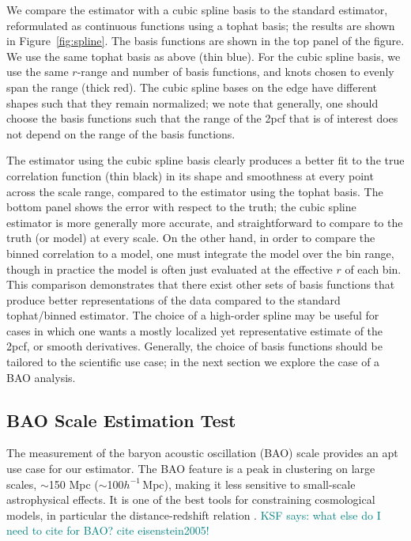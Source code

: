 \documentclass[modern]{aastex62}
\newcommand{\cf}{2pcf\xspace} %
\newcommand{\hmpc}{$h^{-1}\,$Mpc}
\newcommand{\KSF}[1]{\textcolor{teal}{KSF says: #1}}
\begin{document}
We compare the estimator with a cubic spline basis to the standard estimator, reformulated as continuous functions using a tophat basis; the results are shown in Figure~\ref{fig:spline}.
The basis functions are shown in the top panel of the figure.
We use the same tophat basis as above (thin blue).
For the cubic spline basis, we use the same $r$-range and number of basis functions, and knots chosen to evenly span the range (thick red). 
The cubic spline bases on the edge have different shapes such that they remain normalized; we note that generally, one should choose the basis functions such that the range of the \cf that is of interest does not depend on the range of the basis functions.

The estimator using the cubic spline basis clearly produces a better fit to the true correlation function (thin black) in its shape and smoothness at every point across the scale range, compared to the estimator using the tophat basis.
The bottom panel shows the error with respect to the truth; the cubic spline estimator is more generally more accurate, and straightforward to compare to the truth (or model) at every scale.
On the other hand, in order to compare the binned correlation to a model, one must integrate the model over the bin range, though in practice the model is often just evaluated at the effective $r$ of each bin.
This comparison demonstrates that there exist other sets of basis functions that produce better representations of the data compared to the standard tophat/binned estimator.
The choice of a high-order spline may be useful for cases in which one wants a mostly localized yet representative estimate of the \cf, or smooth derivatives.
Generally, the choice of basis functions should be tailored to the scientific use case; in the next section we explore the case of a BAO analysis.


\subsection{BAO Scale Estimation Test}
\label{sec:bao}

The measurement of the baryon acoustic oscillation (BAO) scale provides an apt use case for our estimator.
The BAO feature is a peak in clustering on large scales, $\sim$150 Mpc ($\sim$100\hmpc), making it less sensitive to small-scale astrophysical effects.
It is one of the best tools for constraining cosmological models, in particular the distance-redshift relation \citep{Kazin2010, Anderson2012, Anderson2014, Alam2016}.
\KSF{what else do I need to cite for BAO? cite eisenstein2005!}
\end{document}
